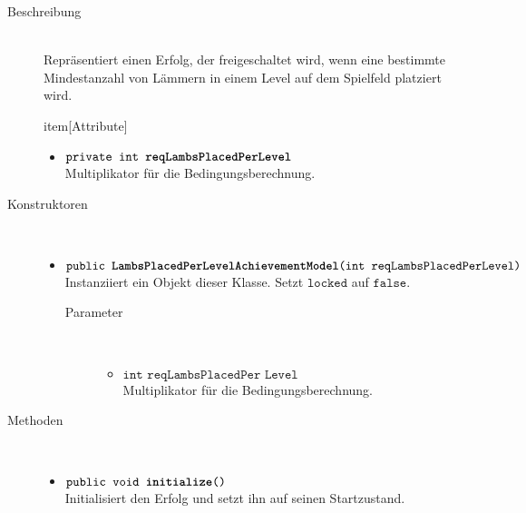 \begin{description}
\item[Beschreibung] \hfill \\ Repräsentiert einen Erfolg, der freigeschaltet wird, wenn eine bestimmte Mindestanzahl von Lämmern in einem Level auf dem Spielfeld platziert wird.
	
	
item[Attribute] \hfill \\
	\vspace{-.8cm}
	\begin{itemize}
		\item $\texttt{private int \textbf{reqLambsPlacedPerLevel}}$ \\ Multiplikator für die Bedingungsberechnung.
	\end{itemize}	
	
\item[Konstruktoren] \hfill \\
	\vspace{-.8cm}
	\begin{itemize}
		\item $\texttt{public \textbf{LambsPlacedPerLevelAchievementModel}(int reqLambsPlacedPerLevel)}$ \\ Instanziiert ein Objekt dieser Klasse. Setzt $\texttt{locked}$ auf $\texttt{false}$.
		\begin{description}
			\item[Parameter] \hfill \\
			\vspace{-.8cm}
			\begin{itemize}
				\item $\texttt{int reqLambsPlacedPer Level}$ \\ Multiplikator für die Bedingungsberechnung.
			\end{itemize}
		\end{description}
	\end{itemize}
	
\item[Methoden] \hfill \\
	\vspace{-.8cm}
	\begin{itemize}
				\item $\texttt{public void \textbf{initialize}()}$ \\ Initialisiert den Erfolg und setzt ihn auf seinen Startzustand.
		

\end{itemize}
\end{description}
